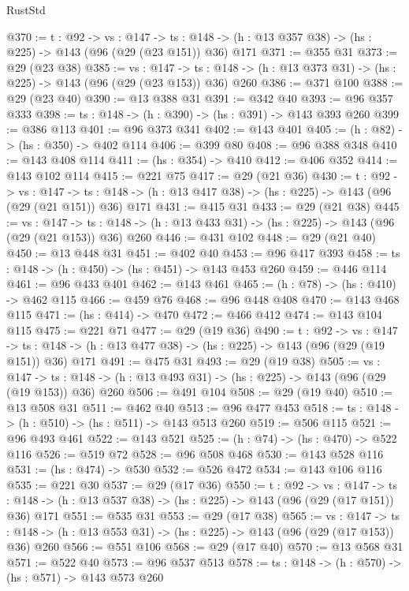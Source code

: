 \begin{lexlean}{RustStd}
\begin{coremodule}
@370 := {t : @92} ->
  {vs : @147} ->
  {ts : @148} -> (h : @13 @357 @38) -> (hs : @225) -> @143 (@96 (@29 (@23 @151)) @36) @171
@371 := @355 @31
@373 := @29 (@23 @38)
@385 := {vs : @147} ->
  {ts : @148} -> (h : @13 @373 @31) -> (hs : @225) -> @143 (@96 (@29 (@23 @153)) @36) @260
@386 := @371 @100
@388 := @29 (@23 @40)
@390 := @13 @388 @31
@391 := @342 @40
@393 := @96 @357 @333
@398 := {ts : @148} -> (h : @390) -> (hs : @391) -> @143 @393 @260
@399 := @386 @113
@401 := @96 @373 @341
@402 := @143 @401
@405 := (h : @82) -> (hs : @350) -> @402 @114
@406 := @399 @80
@408 := @96 @388 @348
@410 := @143 @408 @114
@411 := (hs : @354) -> @410
@412 := @406 @352
@414 := @143 @102 @114
@415 := @221 @75
@417 := @29 (@21 @36)
@430 := {t : @92} ->
  {vs : @147} ->
  {ts : @148} -> (h : @13 @417 @38) -> (hs : @225) -> @143 (@96 (@29 (@21 @151)) @36) @171
@431 := @415 @31
@433 := @29 (@21 @38)
@445 := {vs : @147} ->
  {ts : @148} -> (h : @13 @433 @31) -> (hs : @225) -> @143 (@96 (@29 (@21 @153)) @36) @260
@446 := @431 @102
@448 := @29 (@21 @40)
@450 := @13 @448 @31
@451 := @402 @40
@453 := @96 @417 @393
@458 := {ts : @148} -> (h : @450) -> (hs : @451) -> @143 @453 @260
@459 := @446 @114
@461 := @96 @433 @401
@462 := @143 @461
@465 := (h : @78) -> (hs : @410) -> @462 @115
@466 := @459 @76
@468 := @96 @448 @408
@470 := @143 @468 @115
@471 := (hs : @414) -> @470
@472 := @466 @412
@474 := @143 @104 @115
@475 := @221 @71
@477 := @29 (@19 @36)
@490 := {t : @92} ->
  {vs : @147} ->
  {ts : @148} -> (h : @13 @477 @38) -> (hs : @225) -> @143 (@96 (@29 (@19 @151)) @36) @171
@491 := @475 @31
@493 := @29 (@19 @38)
@505 := {vs : @147} ->
  {ts : @148} -> (h : @13 @493 @31) -> (hs : @225) -> @143 (@96 (@29 (@19 @153)) @36) @260
@506 := @491 @104
@508 := @29 (@19 @40)
@510 := @13 @508 @31
@511 := @462 @40
@513 := @96 @477 @453
@518 := {ts : @148} -> (h : @510) -> (hs : @511) -> @143 @513 @260
@519 := @506 @115
@521 := @96 @493 @461
@522 := @143 @521
@525 := (h : @74) -> (hs : @470) -> @522 @116
@526 := @519 @72
@528 := @96 @508 @468
@530 := @143 @528 @116
@531 := (hs : @474) -> @530
@532 := @526 @472
@534 := @143 @106 @116
@535 := @221 @30
@537 := @29 (@17 @36)
@550 := {t : @92} ->
  {vs : @147} ->
  {ts : @148} -> (h : @13 @537 @38) -> (hs : @225) -> @143 (@96 (@29 (@17 @151)) @36) @171
@551 := @535 @31
@553 := @29 (@17 @38)
@565 := {vs : @147} ->
  {ts : @148} -> (h : @13 @553 @31) -> (hs : @225) -> @143 (@96 (@29 (@17 @153)) @36) @260
@566 := @551 @106
@568 := @29 (@17 @40)
@570 := @13 @568 @31
@571 := @522 @40
@573 := @96 @537 @513
@578 := {ts : @148} -> (h : @570) -> (hs : @571) -> @143 @573 @260

\end{coremodule}
\end{lexlean}
